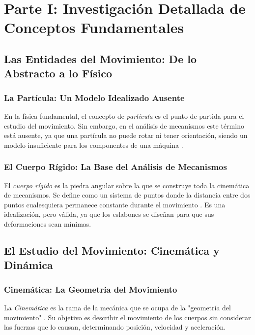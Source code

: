 \documentclass[12pt,a4paper]{article}
\begin{document}

\section{Parte I: Investigación Detallada de Conceptos Fundamentales}

\subsection{Las Entidades del Movimiento: De lo Abstracto a lo Físico}

\subsubsection{La Partícula: Un Modelo Idealizado Ausente}
En la física fundamental, el concepto de \textit{partícula} es el punto de partida para el estudio del movimiento. Sin embargo, en el análisis de mecanismos este término está ausente, ya que una partícula no puede rotar ni tener orientación, siendo un modelo insuficiente para los componentes de una máquina \cite{lopez-cajun-2008}.

\subsubsection{El Cuerpo Rígido: La Base del Análisis de Mecanismos}
El \textit{cuerpo rígido} es la piedra angular sobre la que se construye toda la cinemática de mecanismos. Se define como un sistema de puntos donde la distancia entre dos puntos cualesquiera permanece constante durante el movimiento \cite{lopez-cajun-2008}. Es una idealización, pero válida, ya que los eslabones se diseñan para que sus deformaciones sean mínimas.

\subsection{El Estudio del Movimiento: Cinemática y Dinámica}

\subsubsection{Cinemática: La Geometría del Movimiento}
La \textit{Cinemática} es la rama de la mecánica que se ocupa de la "geometría del movimiento" \cite{lopez-cajun-2008}. Su objetivo es describir el movimiento de los cuerpos sin considerar las fuerzas que lo causan, determinando posición, velocidad y aceleración.
\end{document}

